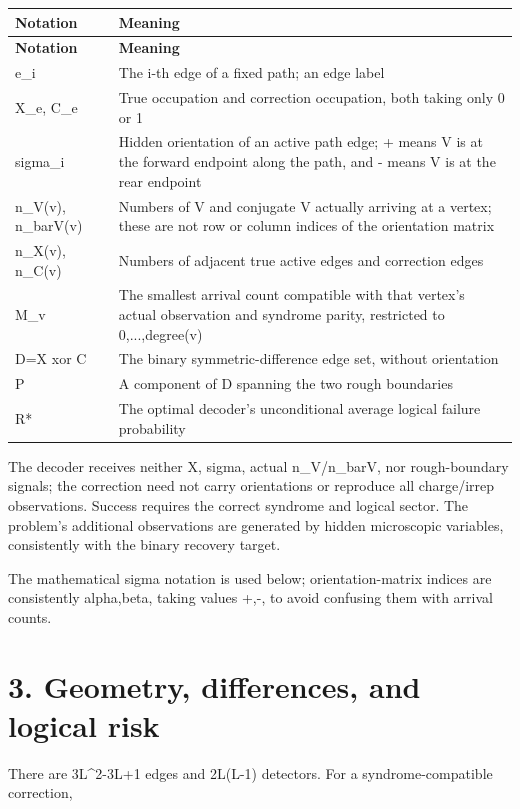 \documentclass[11pt,a4paper]{article}
\begin{document}
{\fontsize{9}{12.5}\selectfont
\setlength{\tabcolsep}{2.2pt}

\begin{longtable}{>{\raggedright\arraybackslash}p{}>{\raggedright\arraybackslash}p{}}
\toprule
\textbf{Notation} & \textbf{Meaning}\tabularnewline
\midrule
\endfirsthead
\toprule
\textbf{Notation} & \textbf{Meaning}\tabularnewline
\midrule
\endhead
{}e\_i & The i-th edge of a fixed path; an edge label\tabularnewline
{}X\_e, C\_e & True occupation and correction occupation, both taking only 0 or 1\tabularnewline
{}sigma\_i & Hidden orientation of an active path edge; + means V is at the forward endpoint along the path, and - means V is at the rear endpoint\tabularnewline
{}n\_V(v), n\_barV(v) & Numbers of V and conjugate V actually arriving at a vertex; these are not row or column indices of the orientation matrix\tabularnewline
{}n\_X(v), n\_C(v) & Numbers of adjacent true active edges and correction edges\tabularnewline
{}M\_v & The smallest arrival count compatible with that vertex's actual observation and syndrome parity, restricted to 0,...,degree(v)\tabularnewline
{}D=X xor C & The binary symmetric-difference edge set, without orientation\tabularnewline
{}P & A component of D spanning the two rough boundaries\tabularnewline
{}R* & The optimal decoder's unconditional average logical failure probability\tabularnewline
\bottomrule
\end{longtable}
}

The decoder receives neither X, sigma, actual n\_V/\allowbreak{}n\_barV, nor rough-boundary signals; the correction need not carry orientations or reproduce all charge/\allowbreak{}irrep observations. Success requires the correct syndrome and logical sector. The problem's additional observations are generated by hidden microscopic variables, consistently with the binary recovery target.

The mathematical sigma notation is used below; orientation-matrix indices are consistently alpha,beta, taking values +,-, to avoid confusing them with arrival counts.

\section*{3. Geometry, differences, and logical risk}

There are 3L\textasciicircum{}2-3L+1 edges and 2L(L-1) detectors. For a syndrome-compatible correction,
\end{document}
